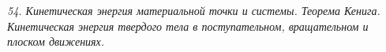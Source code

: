 \emph{54. Кинетическая энергия материальной точки и системы. Теорема Кенига.
Кинетическая энергия твердого тела в поступательном, вращательном и плоском
движениях.}

\newpage
